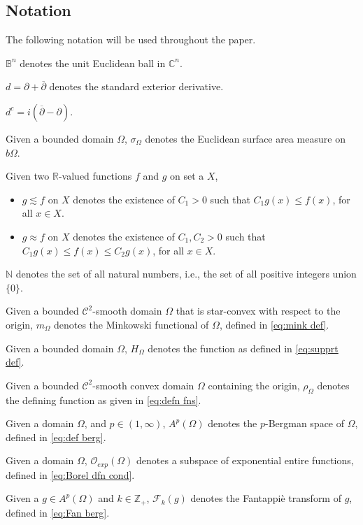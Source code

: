\documentclass[11pt, oneside, reqno]{amsart}
\numberwithin{equation}{section}
\theoremstyle{definition}
\newcommand{\hol}{\mathcal {O}}
\newcommand{\cont}{\mathcal C}
\newcommand{\C}{\mathbb C}
\newcommand{\N}{\mathbb N}
\newcommand{\Z}{\mathbb Z}
\newcommand{\R}{\mathbb{R}}
\newcommand{\ltt}{\left(}
\newcommand{\rtt}{\right)}
\newcommand{\Om}{\Omega}
\begin{document}
{\subsection{Notation} The following notation will be used throughout the paper. 
\begin{itemize}
    \item[(1)] $\mathbb B^n$ denotes the unit Euclidean ball in $\C^n$.
     \item [(2)] $d=\partial+\overline{\partial}$ denotes the standard exterior derivative.
    \item [(3)] $d^c={i}\ltt{\overline{\partial}-\partial}\rtt.$
    \item [(4)] Given a bounded domain $\Om$, $\sigma_\Om$ denotes the Euclidean surface area measure on $b\Om$.
    \item [(5)] Given two $\R$-valued functions $f$ and $g$ on set a $X$,
    \begin{itemize}
   \item $g\lesssim f$ on $X$ denotes the existence of $C_1>0$ such that $C_1 g(x)\leq f(x)$, for all $x\in X$.
   \item $g\approx f$ on $X$ denotes the existence of $C_1,C_2>0$ such that $C_1 g(x)\leq f(x)\leq C_2 g(x)$, for all $x\in X$. 
    \end{itemize}
    \item[(6)] $\N$ denotes the set of all natural numbers, i.e., the set of all positive integers union $\{0\}$.
   {
    \item[(7)] Given a bounded $\cont^2$-smooth domain $\Om$ that is star-convex with respect to the origin, $m_\Om$ denotes the Minkowski functional of $\Om$, defined in \eqref{eq:mink def}.   
    \item[(8)] Given a bounded domain $\Om$, $H_\Om$ denotes the function as defined in \eqref{eq:supprt def}.
    \item[(9)] Given a bounded $\cont^2$-smooth convex domain $\Om$ containing the origin, $\rho_\Om$ denotes the defining function as given in \eqref{eq:defn fns}.
    \item[(10)] Given a domain $\Om$, and $p\in(1,\infty)$, $A^p(\Om)$ denotes the $p$-Bergman space of $\Om$, defined in \eqref{eq:def berg}. 
    \item[(11)] Given a domain $\Om$, $\hol_{exp}(\Om)$ denotes a subspace of exponential entire functions, defined in \eqref{eq:Borel dfn cond}. 
    \item[(12)] Given a $g\in A^p(\Om)$ and $k\in\Z_+$,
    $\mathcal F_k(g)$ denotes the Fantappi{\`e} transform of $g$, defined in \eqref{eq:Fan berg}.
}
\end{itemize}}
\end{document}
